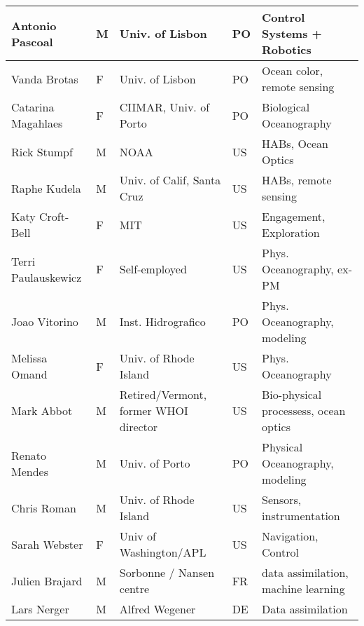 \begin{table}[]
{\begin{tabular}{|p{3cm}|p{0.5cm}|p{3.5cm}|p{1cm}|p{4cm}|}
\hline
Antonio Pascoal          & M   & Univ. of Lisbon                       & PO       & Control Systems + Robotics                      \\
\hline
Vanda Brotas             & F   & Univ. of Lisbon                       & PO       & Ocean color, remote sensing                     \\
\hline
Catarina Magahlaes       & F   & CIIMAR, Univ. of Porto                & PO       & Biological Oceanography                         \\
\hline
Rick Stumpf              & M   & NOAA                                  & US       & HABs, Ocean Optics                              \\
\hline
Raphe Kudela             & M   & Univ. of Calif, Santa Cruz            & US       & HABs, remote sensing                            \\
\hline
Katy Croft-Bell          & F   & MIT                                   & US       & Engagement, Exploration                         \\
\hline
Terri Paulauskewicz      & F   & Self-employed                         & US       & Phys. Oceanography, ex-PM                       \\
\hline
Joao Vitorino            & M   & Inst. Hidrografico                    & PO       & Phys. Oceanography, modeling                    \\
\hline
Melissa Omand            & F   & Univ. of Rhode Island                 & US       & Phys. Oceanography                              \\
\hline
Mark Abbot               & M   & Retired/Vermont, former WHOI director & US       & Bio-physical processess, ocean optics           \\
\hline
Renato Mendes            & M   & Univ. of Porto                        & PO       & Physical Oceanography, modeling                 \\
\hline
Chris Roman              & M   & Univ. of Rhode Island                 & US       & Sensors, instrumentation                        \\
\hline
Sarah Webster            & F   & Univ of Washington/APL                & US       & Navigation, Control                             \\
\hline
Julien Brajard           & M   & Sorbonne / Nansen centre              & FR       & data assimilation, machine learning             \\
\hline
Lars Nerger              & M   & Alfred Wegener                        & DE       & Data assimilation                               \\

\end{tabular}}
\end{table}

